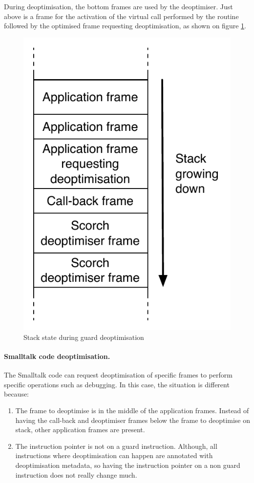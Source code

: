 \documentclass[a4paper,12pt,twoside]{../includes/ThesisStyle}
\begin{document}
During deoptimisation, the bottom frames are used by the deoptimiser. Just above is a frame for the activation of the virtual call performed by the routine followed by the optimised frame requesting deoptimisation, as shown on figure \ref{fig:DeoptCallBackStack}.

\begin{figure}[h!]
    \begin{center}
        \includegraphics[width=0.4\linewidth]{DeoptCallBackStack}
        \caption{Stack state during guard deoptimisation}
        \label{fig:DeoptCallBackStack}
    \end{center}
\end{figure}


\paragraph{Smalltalk code deoptimisation.}The Smalltalk code can request deoptimisation of specific frames to perform specific operations such as debugging. In this case, the situation is different because:
\begin{enumerate}
	\item The frame to deoptimise is in the middle of the application frames. Instead of having the call-back and deoptimiser frames below the frame to deoptimise on stack, other application frames are present.
	\item The instruction pointer is not on a guard instruction. Although, all instructions where deoptimisation can happen are annotated with deoptimisation metadata, so having the instruction pointer on a non guard instruction does not really change much.
\end{enumerate}
\end{document}
